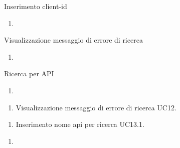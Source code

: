 \begin{usecase}{11.1}{Inserimento client-id}\label{uc:}
    \usecasepre{}
    \usecasedesc{}
    \usecasepost{}

    \usecasemain{}
        \begin{enumerate}
            \item 
        \end{enumerate}

\end{usecase}


\begin{usecase}{12}{Visualizzazione messaggio di errore di ricerca}\label{uc:}
    \usecasepre{}
    \usecasedesc{}
    \usecasepost{}

    \usecasemain{}
        \begin{enumerate}
            \item 
        \end{enumerate}

\end{usecase}


\begin{usecase}{13}{Ricerca per API}\label{uc:}
    \usecasepre{}
    \usecasedesc{}
    \usecasepost{}

    \usecasemain{}
        \begin{enumerate}
            \item 
        \end{enumerate}

    \usecaseext{}
        \begin{enumerate}
            \item Visualizzazione messaggio di errore di ricerca UC12.
        \end{enumerate}

    \usecasegen{}
        \begin{enumerate}
            \item Inserimento nome api per ricerca UC13.1.
        \end{enumerate}

\end{usecase}



\begin{usecase}{}{}\label{uc:}
    \usecasepre{}
    \usecasedesc{}
    \usecasepost{}

    \usecasemain{}
        \begin{enumerate}
            \item 
        \end{enumerate}

\end{usecase}



